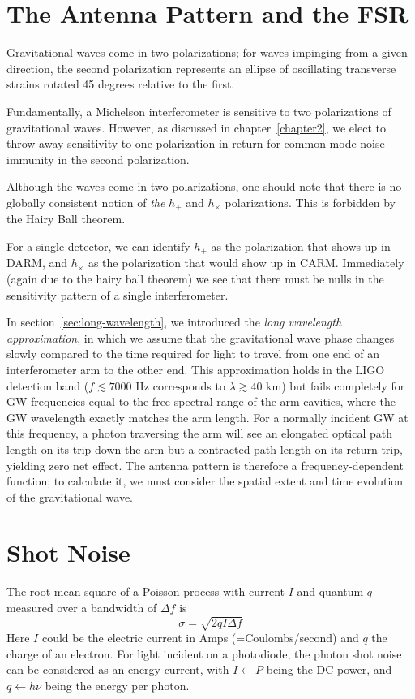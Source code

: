 \section{The Antenna Pattern and the FSR}
\label{sec:antenna-pattern}
Gravitational waves come in two polarizations; for waves impinging
from a given direction, the second polarization represents an ellipse
of oscillating transverse strains rotated 45 degrees relative to the
first.  

Fundamentally, a Michelson interferometer is sensitive to two
polarizations of gravitational waves.  However, as discussed in chapter~\ref{chapter2}, we
elect to throw away sensitivity to one polarization in return for
common-mode noise immunity in the second polarization.

Although the waves come in two polarizations, one should note that
there is no globally consistent notion of \emph{the} $h_+$ and
$h_\times$ polarizations.  This is forbidden by the Hairy Ball
theorem.  

For a single detector, we can identify $h_+$ as the polarization
that shows up in DARM, and $h_\times$ as the polarization that would
show up in CARM.  Immediately (again due to the hairy ball theorem) we
see that there must be nulls in the sensitivity pattern of a single
interferometer.

In section~\ref{sec:long-wavelength}, we introduced the \emph{long
  wavelength approximation}, in which we assume that the gravitational
wave phase changes slowly compared to the time required for light to
travel from one end of an interferometer arm to the other end.  This
approximation holds in the LIGO detection band ($f \lesssim 7000$ Hz
corresponds to $\lambda \gtrsim 40$ km) but fails completely for GW
frequencies equal to the free spectral range of the arm cavities,
where the GW wavelength exactly matches the arm length.  For a
normally incident GW at this frequency, a photon traversing the arm
will see an elongated optical path length on its trip down the arm but
a contracted path length on its return trip, yielding zero net effect.
The antenna pattern is therefore a frequency-dependent function; to
calculate it, we must consider the spatial extent and time evolution
of the gravitational wave.


\section{Shot Noise}
The root-mean-square of a Poisson process with current $I$ and quantum
$q$ measured over a bandwidth of $\Delta f$ is 
$$\sigma = \sqrt{2 q I \Delta f}$$ 
Here $I$ could be the electric current in Amps (=Coulombs/second) and
$q$ the charge of an electron.  For light incident on a photodiode,
the photon shot noise can be considered as an energy current, with
$I\leftarrow P$ being the DC power, and $q\leftarrow h\nu$ being the
energy per photon.

